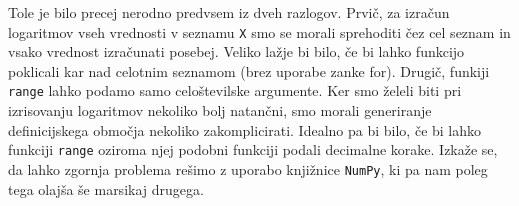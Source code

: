 Tole je bilo precej nerodno predvsem iz dveh razlogov. Prvič, za izračun logaritmov vseh vrednosti v seznamu \texttt{X} smo se morali sprehoditi čez cel seznam in vsako vrednost izračunati posebej. Veliko lažje bi bilo, če bi lahko funkcijo poklicali kar nad celotnim seznamom (brez uporabe zanke for). Drugič, funkiji \texttt{range} lahko podamo samo celoštevilske argumente. Ker smo želeli biti pri izrisovanju logaritmov nekoliko bolj natančni, smo morali generiranje definicijskega območja nekoliko zakomplicirati. Idealno pa bi bilo, če bi lahko funkciji \texttt{range} oziroma njej podobni funkciji podali decimalne korake. Izkaže se, da lahko zgornja problema rešimo z uporabo knjižnice \texttt{NumPy}, ki pa nam poleg tega olajša še marsikaj drugega.
